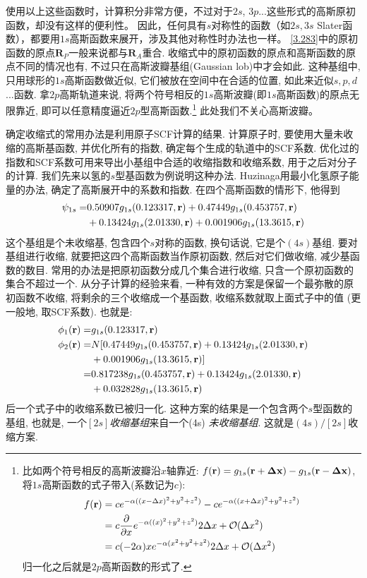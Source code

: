 使用以上这些函数时，计算积分非常方便，不过对于$2s$, $3p$...这些形式的高斯原初函数，却没有这样的便利性。
因此，任何具有$s$对称性的函数（如$2s,3s$ Slater函数），都要用$1s$高斯函数来展开，涉及其他对称性时办法也一样。
\eqref{3.283}中的原初函数的原点$\mathbf{R}_P$一般来说都与$\mathbf{R}_A$重合. 
收缩式中的原初函数的原点和高斯函数的原点不同的情况也有, 不过只在高斯波瓣基组(Gaussian lob)中才会如此. 
这种基组中, 只用球形的$1s$高斯函数做近似, 它们被放在空间中在合适的位置, 如此来近似$s,p,d$...函数. 
拿$2p$高斯轨道来说, 将两个符号相反的$1s$高斯波瓣(即$1s$高斯函数)的原点无限靠近, 即可以任意精度逼近$2p$型高斯函数.\footnote{
	比如两个符号相反的高斯波瓣沿$x$轴靠近: $f(\mathbf{r})=g_{1s}(\mathbf{r}+\mathbf{\Delta x})-g_{1s}(\mathbf{r}-\mathbf{\Delta x})$, 
	将$1s$高斯函数的式子带入(系数记为$c$):
	\begin{align*}
		f(\mathbf{r}) & = ce^{-\alpha((x-\Delta x)^2+y^2+z^2)}-
		ce^{-\alpha((x+\Delta x)^2+y^2+z^2)}\\
		& = c\frac{\partial}{\partial x}e^{-\alpha((x)^2+y^2+z^2)}2\Delta x +\mathcal{O}(\Delta x^2)\\
		& = c(-2\alpha) xe^{-\alpha(x^2+y^2+z^2)}2\Delta x +\mathcal{O}(\Delta x^2)
	\end{align*}
	归一化之后就是$2p$高斯函数的形式了.
}
此处我们不关心高斯波瓣。


确定收缩式的常用办法是利用原子SCF计算的结果. 
计算原子时, 
要使用大量未收缩的高斯基函数, 
并优化所有的指数, 
确定每个生成的轨道中的SCF系数. 
优化过的指数和SCF系数可用来导出小基组中合适的收缩指数和收缩系数, 
用于之后对分子的计算. 
我们先来以氢的$s$型基函数为例说明这种办法. 
Huzinaga用最小化氢原子能量的办法, 
确定了高斯展开中的系数和指数. 
在四个高斯函数的情形下, 
他得到
\begin{align}
	\psi_{1s} = &   0.50907g_{1s}(0.123317,\mathbf{r}) + 0.47449 g_{1s}(0.453757,\mathbf{r}) \notag\\
	& + 0.13424 g_{1s}(2.01330,\mathbf{r}) + 0.001906 g_{1s}(13.3615,\mathbf{r})
\end{align}
这个基组是个未收缩基, 
包含四个$s$对称的函数, 
换句话说, 
它是个$(4s)$基组. 
要对基组进行收缩, 
就要把这四个高斯函数当作原初函数, 
然后对它们做收缩, 
减少基函数的数目. 
常用的办法是把原初函数分成几个集合进行收缩, 
只含一个原初函数的集合不超过一个. 
从分子计算的经验来看, 
一种有效的方案是保留一个最弥散的原初函数不收缩, 
将剩余的三个收缩成一个基函数, 
收缩系数就取上面式子中的值 (更一般地, 
取SCF系数). 
也就是:
\begin{align}
	\phi_1(\mathbf{r}) = & g_{1s}(0.123317,\mathbf{r})                                               \\
	\phi_2(\mathbf{r}) = & N[0.47449g_{1s}(0.453757,\mathbf{r})+ 0.13424 g_{1s}(2.01330,\mathbf{r}) \notag \\
	& + 0.001906 g_{1s}(13.3615,\mathbf{r})]                                    \\
	=              & 0.817238g_{1s}(0.453757,\mathbf{r})+ 0.13424 g_{1s}(2.01330,\mathbf{r})         \\
	& +0.032828 g_{1s}(13.3615,\mathbf{r})
\end{align}
后一个式子中的收缩系数已被归一化. 
这种方案的结果是一个包含两个$s$型函数的基组, 
也就是, 
一个\emph{$[2s]$收缩基组}来自一个(4s) \emph{未收缩基组}. 
这就是$(4s)/[2s]$收缩方案.


